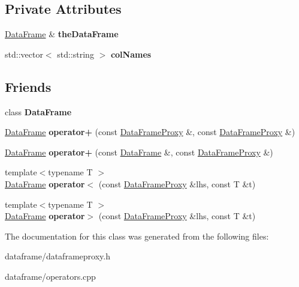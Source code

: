 \subsection*{Private Attributes}
\begin{DoxyCompactItemize}
\item 
\mbox{\label{classDataFrame_1_1DataFrameProxy_a084054173a10f1494e0748c68e06fb3a}} 
\hyperlink{classDataFrame}{Data\+Frame} \& {\bfseries the\+Data\+Frame}
\item 
\mbox{\label{classDataFrame_1_1DataFrameProxy_a0ba3f257ca6e7506dda6ec39a1db414d}} 
std\+::vector$<$ std\+::string $>$ {\bfseries col\+Names}
\end{DoxyCompactItemize}
\subsection*{Friends}
\begin{DoxyCompactItemize}
\item 
\mbox{\label{classDataFrame_1_1DataFrameProxy_ac3cf826bc43b8ab4740915b5c60e7166}} 
class {\bfseries Data\+Frame}
\item 
\mbox{\label{classDataFrame_1_1DataFrameProxy_ac7252ac5b8145feb97ce0b16040cdbde}} 
\hyperlink{classDataFrame}{Data\+Frame} {\bfseries operator+} (const \hyperlink{classDataFrame_1_1DataFrameProxy}{Data\+Frame\+Proxy} \&, const \hyperlink{classDataFrame_1_1DataFrameProxy}{Data\+Frame\+Proxy} \&)
\item 
\mbox{\label{classDataFrame_1_1DataFrameProxy_a32fc0676af70bd35bf83e11c9ab946fc}} 
\hyperlink{classDataFrame}{Data\+Frame} {\bfseries operator+} (const \hyperlink{classDataFrame}{Data\+Frame} \&, const \hyperlink{classDataFrame_1_1DataFrameProxy}{Data\+Frame\+Proxy} \&)
\item 
\mbox{\label{classDataFrame_1_1DataFrameProxy_aaa1e3264e141ab931043d7f50c784394}} 
{\footnotesize template$<$typename T $>$ }\\\hyperlink{classDataFrame}{Data\+Frame} {\bfseries operator$<$} (const \hyperlink{classDataFrame_1_1DataFrameProxy}{Data\+Frame\+Proxy} \&lhs, const T \&t)
\item 
\mbox{\label{classDataFrame_1_1DataFrameProxy_a32bee46933cf3c0a26f549928805ba22}} 
{\footnotesize template$<$typename T $>$ }\\\hyperlink{classDataFrame}{Data\+Frame} {\bfseries operator$>$} (const \hyperlink{classDataFrame_1_1DataFrameProxy}{Data\+Frame\+Proxy} \&lhs, const T \&t)
\end{DoxyCompactItemize}


The documentation for this class was generated from the following files\+:\begin{DoxyCompactItemize}
\item 
dataframe/dataframeproxy.\+h\item 
dataframe/operators.\+cpp\end{DoxyCompactItemize}
